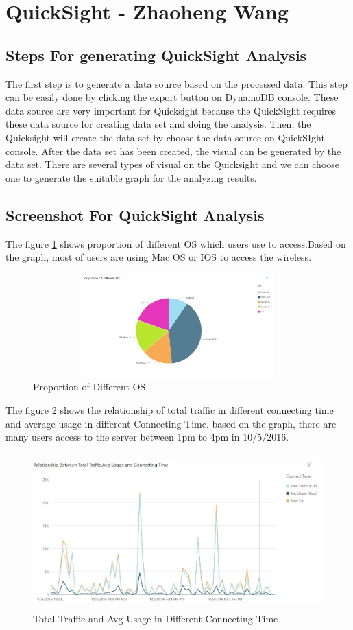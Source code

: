 \section{QuickSight - Zhaoheng Wang}
 	 \subsection{Steps For generating QuickSight Analysis}
 	The first step is to generate a data source based on the processed data. This step can be easily done by clicking the export button on DynamoDB console.  These data source are very important for Quicksight because the QuickSight requires these data source for creating data set and doing the analysis. Then, the Quicksight will create the data set by choose the data source on QuickSIght console. After the data set has been created, the visual can be generated by the data set. There are several types of visual on the Quicksight and we can choose one to generate the suitable graph for the analyzing results.
 \subsection{Screenshot For QuickSight Analysis}
 	The figure \ref{fig:3} shows proportion of different OS which users use to access.Based on the graph, most of users are using Mac OS or IOS to access the wireless.
 \begin{figure}[H]
 \includegraphics[width=12cm, height=4cm]{3.jpg}
 \centering
 \caption{\label{fig:3}Proportion of Different OS}
 \end{figure}
 
 The figure \ref{fig:4} shows the relationship of total traffic in different connecting time and average usage in different Connecting Time. based on the graph, there are many users access to the server between 1pm to 4pm in 10/5/2016.
 \begin{figure}[H]
 \includegraphics[width=17cm, height=6cm]{6.jpg}
 \centering
 \caption{\label{fig:4}Total Traffic and Avg Usage in Different Connecting Time }
 \end{figure}


